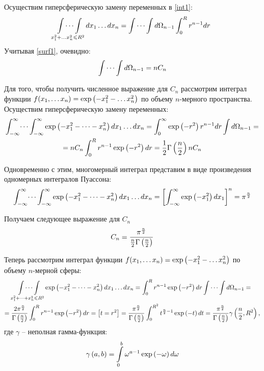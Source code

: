 Осуществим гиперсферическую замену переменных в \eqref{int1}:
\vverh
\begin{gather}
	\idotsint\limits_{x_1^2 + \dots x_n^2 \leqslant R^2} dx_1 \dots dx_n = \idotsint d \Omega_{n-1} \int_{0}^{R} r^{n-1} dr \notag
\end{gather}
Учитывая \eqref{surf1}, очевидно:
\vverh
\begin{gather}
	\idotsint d \Omega_{n-1} = n C_n \notag
\end{gather}

Для того, чтобы получить численное выражение для $C_n$ рассмотрим интеграл функции $f(x_1, \dots x_n) = \exp \left( -x_1^2 - \dots x_n^2 \right)$ по объему $n$-мерного пространства. Осуществим гиперсферическую замену переменных: 
\vverh
\begin{gather}
	\int_{-\infty}^{\infty} \dots \int_{-\infty}^{\infty} \exp \left( -x_1^2 - \dots -x_n^2 \right) dx_1 \dots dx_n = \int_{0}^{\infty} \exp \left( -r^2 \right) r^{n-1} dr \int d \Omega_{n-1}  = \notag \\
	= n C_n \int_{0}^{R} r^{n-1} \exp \left( -r^2 \right) dr = \frac{1}{2} \Gamma \left( \frac{n}{2} \right) n C_n \notag
\end{gather}

Одновременно с этим, многомерный интеграл представим в виде произведения одномерных интегралов Пуассона:
\vverh
\begin{gather}
	\int_{-\infty}^{\infty} \dots \int_{-\infty}^{\infty} \exp \left( -x_1^2 - \dots - x_n^2 \right) d x_1 \dots dx_n = \left[ \int_{-\infty}^{\infty} \exp \left( -x_1^2 \right) dx_1 \right]^n  = \pi^\frac{n}{2} \notag 
\end{gather}

Получаем следующее выражение для $C_n$ 
\vverh
\begin{gather}
	C_n = \frac{\pi^\frac{n}{2}}{\frac{n}{2} \Gamma \left( \frac{n}{2} \right)} \notag
\end{gather}

Теперь рассмотрим интеграл функции $f(x_1, \dots x_n) = \exp \left( -x_1^2 - \dots x_n^2 \right)$ по объему $n$-мерной сферы:  
\begin{gather}
	\idotsint\limits_{x_1^2 + \dots + x_n^2 \leqslant R^2} \exp \left( -x_1^2 - \dots - x_n^2 \right) dx_1 \dots dx_n = \int_{0}^{R} r^{n-1} \exp \left( -r^2 \right) dr \idotsint d \Omega_{n-1} = \notag \\
	= \frac{2 \pi^{\frac{n}{2}}}{\Gamma \left( \frac{n}{2} \right)} \int_{0}^{R} r^{n-1} \exp \left( -r^2 \right) dr = \left[ t = r^2 \right] = \frac{\pi^{\frac{n}{2}}}{\Gamma \left( \frac{n}{2} \right)} \int_{0}^{R^2} t^{\frac{n}{2} - 1} \exp \left( -t \right) dt = \frac{\pi^{\frac{n}{2}}}{\Gamma \left( \frac{n}{2} \right)} \gamma \left( \frac{n}{2}, R^2 \right), \notag
\end{gather}
где $\gamma$ -- неполная гамма-функция:
\vverh
\begin{gather}
	\gamma \left( a, b \right) = \int\limits_{0}^{b} \omega^{a - 1} \exp \left( - \omega \right) d \omega \notag
\end{gather}



